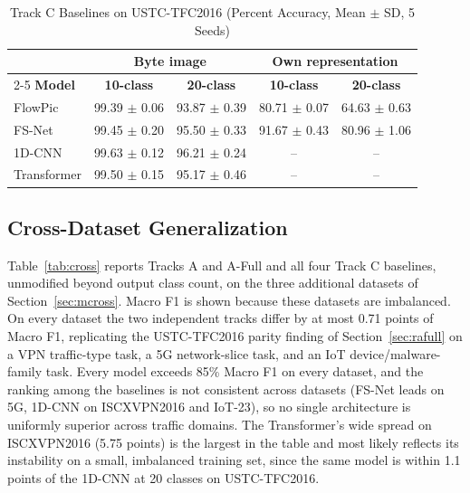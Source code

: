 \documentclass[journal]{IEEEtran}
\begin{document}
\begin{table}[t]
\caption{Track C Baselines on USTC-TFC2016 (Percent Accuracy, Mean $\pm$ SD, 5 Seeds)}
\label{tab:c}
\centering
\renewcommand{\arraystretch}{1.2}
\setlength{\tabcolsep}{3pt}
\begin{tabular}{|l|c|c|c|c|}
\hline
 & \multicolumn{2}{c|}{\textbf{Byte image}} & \multicolumn{2}{c|}{\textbf{Own representation}} \\
\cline{2-5}
\textbf{Model} & \textbf{10-class} & \textbf{20-class} & \textbf{10-class} & \textbf{20-class} \\
\hline
FlowPic & 99.39 $\pm$ 0.06 & 93.87 $\pm$ 0.39 & 80.71 $\pm$ 0.07 & 64.63 $\pm$ 0.63 \\
\hline
FS-Net & 99.45 $\pm$ 0.20 & 95.50 $\pm$ 0.33 & 91.67 $\pm$ 0.43 & 80.96 $\pm$ 1.06 \\
\hline
1D-CNN & 99.63 $\pm$ 0.12 & 96.21 $\pm$ 0.24 & -- & -- \\
\hline
Transformer & 99.50 $\pm$ 0.15 & 95.17 $\pm$ 0.46 & -- & -- \\
\hline
\end{tabular}
\end{table}

\subsection{Cross-Dataset Generalization}\label{sec:rcross}
Table~\ref{tab:cross} reports Tracks A and A-Full and all four Track C baselines, unmodified beyond output class count, on the three additional datasets of Section~\ref{sec:mcross}. Macro F1 is shown because these datasets are imbalanced. On every dataset the two independent tracks differ by at most 0.71 points of Macro F1, replicating the USTC-TFC2016 parity finding of Section~\ref{sec:rafull} on a VPN traffic-type task, a 5G network-slice task, and an IoT device/malware-family task. Every model exceeds 85\% Macro F1 on every dataset, and the ranking among the baselines is not consistent across datasets (FS-Net leads on 5G, 1D-CNN on ISCXVPN2016 and IoT-23), so no single architecture is uniformly superior across traffic domains. The Transformer's wide spread on ISCXVPN2016 (5.75 points) is the largest in the table and most likely reflects its instability on a small, imbalanced training set, since the same model is within 1.1 points of the 1D-CNN at 20 classes on USTC-TFC2016.
\end{document}
